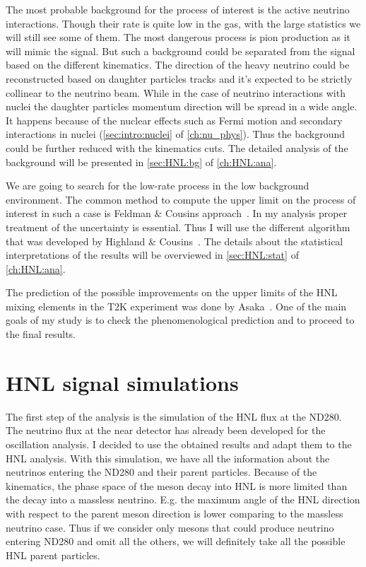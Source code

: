 \documentclass[../main.tex]{subfiles}
\begin{document}
The most probable background for the process of interest is the active neutrino interactions. Though their rate is quite low in the gas, with the large statistics we will still see some of them. The most dangerous process is pion production as it will mimic the signal. But such a background could be separated from the signal based on the different kinematics. The direction of the heavy neutrino could be reconstructed based on daughter particles tracks and it's expected to be strictly collinear to the neutrino beam. While in the case of neutrino interactions with nuclei the daughter particles momentum direction will be spread in a wide angle. It happens because of the nuclear effects such as Fermi motion and secondary interactions in nuclei (\autoref{sec:intro:nuclei} of \autoref{ch:nu_phys}). Thus the background could be further reduced with the kinematics cuts. The detailed analysis of the background will be presented in \autoref{sec:HNL:bg} of \autoref{ch:HNL:ana}.

We are going to search for the low-rate process in the low background environment. The common method to compute the upper limit on the process of interest in such a case is Feldman \& Cousins approach~\cite{Cousins1998}. In my analysis proper treatment of the uncertainty is essential. Thus I will use the different algorithm that was developed by Highland \& Cousins~\cite{Cousins1992}. The details about the statistical interpretations of the results will be overviewed in \autoref{sec:HNL:stat} of \autoref{ch:HNL:ana}.

The prediction of the possible improvements on the upper limits of the HNL mixing elements in the T2K experiment was done by Asaka~\cite{Asaka2012}. One of the main goals of my study is to check the phenomenological prediction and to proceed to the final results.


\chapter{HNL signal simulations}
\label{ch:HNL:HNLsim}
The first step of the analysis is the simulation of the HNL flux at the ND280. The neutrino flux at the near detector has already been developed for the oscillation analysis. I decided to use the obtained results and adapt them to the HNL analysis. With this simulation, we have all the information about the neutrinos entering the ND280 and their parent particles. Because of the kinematics, the phase space of the meson decay into HNL is more limited than the decay into a massless neutrino. E.g. the maximum angle of the HNL direction with respect to the parent meson direction is lower comparing to the massless neutrino case. Thus if we consider only mesons that could produce neutrino entering ND280 and omit all the others, we will definitely take all the possible HNL parent particles.
\end{document}
